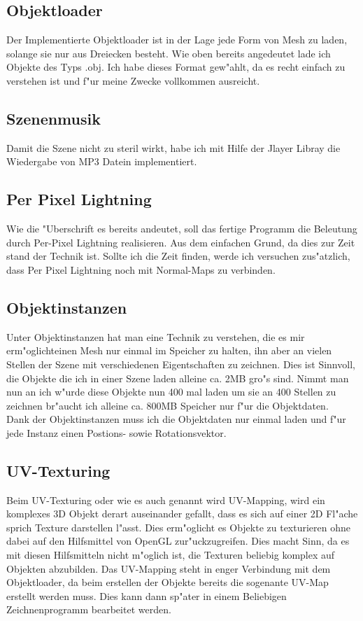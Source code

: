 \documentclass[a4paper,titlepage]{article}
\begin{document}
\subsection{Objektloader}
Der Implementierte Objektloader ist in der Lage jede Form von Mesh zu laden, solange sie nur aus Dreiecken 
besteht. Wie oben bereits angedeutet lade ich Objekte des Typs .obj. Ich habe dieses Format gew"ahlt, da es 
recht einfach zu verstehen ist und f"ur meine Zwecke vollkommen ausreicht.

\subsection{Szenenmusik}
Damit die Szene nicht zu steril wirkt, habe ich mit Hilfe der Jlayer Libray die Wiedergabe von MP3 Datein
implementiert. 

\subsection{Per Pixel Lightning}
Wie die "Uberschrift es bereits andeutet, soll das fertige Programm die Beleutung durch Per-Pixel Lightning 
realisieren. Aus dem einfachen Grund, da dies zur Zeit stand der Technik ist. Sollte ich die Zeit finden, 
werde ich versuchen zus"atzlich, dass Per Pixel Lightning noch mit Normal-Maps zu verbinden.

\subsection{Objektinstanzen}
Unter Objektinstanzen hat man eine Technik zu verstehen, die es mir erm"oglichteinen Mesh nur einmal im 
Speicher zu halten, ihn aber an vielen Stellen der Szene mit verschiedenen Eigentschaften zu zeichnen. Dies 
ist Sinnvoll, die Objekte die ich in einer Szene laden alleine ca. 2MB gro"s sind. Nimmt man nun an ich w"urde 
diese Objekte nun 400 mal laden um sie an 400 Stellen zu zeichnen br"aucht ich alleine ca. 800MB Speicher nur 
f"ur die Objektdaten.\\
Dank der Objektinstanzen muss ich die Objektdaten nur einmal laden und f"ur jede Instanz einen Postions- sowie 
Rotationsvektor.

\subsection{UV-Texturing}
Beim UV-Texturing oder wie es auch genannt wird UV-Mapping, wird ein komplexes 3D Objekt derart auseinander 
gefallt, dass es sich auf einer 2D Fl"ache sprich Texture darstellen l"asst. Dies erm"oglicht es Objekte zu 
texturieren ohne dabei auf den Hilfsmittel von OpenGL zur"uckzugreifen. Dies macht Sinn, da es mit diesen 
Hilfsmitteln nicht m"oglich ist, die Texturen beliebig komplex auf Objekten abzubilden. Das UV-Mapping steht 
in enger Verbindung mit dem Objektloader, da beim erstellen der Objekte bereits die sogenante UV-Map erstellt 
werden muss. Dies kann dann sp"ater in einem Beliebigen Zeichnenprogramm bearbeitet werden.
\end{document}
